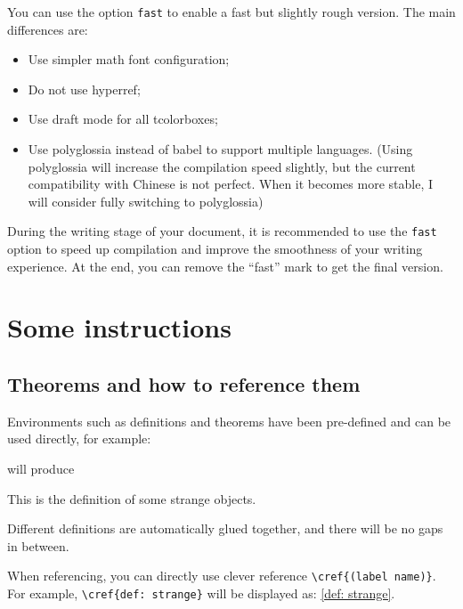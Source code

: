 \documentclass{lebhart}
\begin{document}
You can use the option \verb|fast| to enable a fast but slightly rough version. The main differences are:
\begin{itemize}
    \item Use simpler math font configuration; 
    \item Do not use hyperref; 
    \item Use draft mode for all tcolorboxes; 
    \item Use polyglossia instead of babel to support multiple languages. (Using polyglossia will increase the compilation speed slightly, but the current compatibility with Chinese is not perfect. When it becomes more stable, I will consider fully switching to polyglossia)
\end{itemize}

During the writing stage of your document, it is recommended to use the \verb|fast| option to speed up compilation and improve the smoothness of your writing experience. At the end, you can remove the ``fast'' mark to get the final version.

\section{Some instructions}

\subsection{Theorems and how to reference them}

Environments such as definitions and theorems have been pre-defined and can be used directly, for example:

\begin{definition}
    Different definitions are automatically glued together, and there will be no gaps in between.
\end{definition}

When referencing, you can directly use clever reference \lstinline|\cref{(label name)}|. For example, \lstinline|\cref{def: strange}| will be displayed as: \cref{def: strange}.
\end{document}
